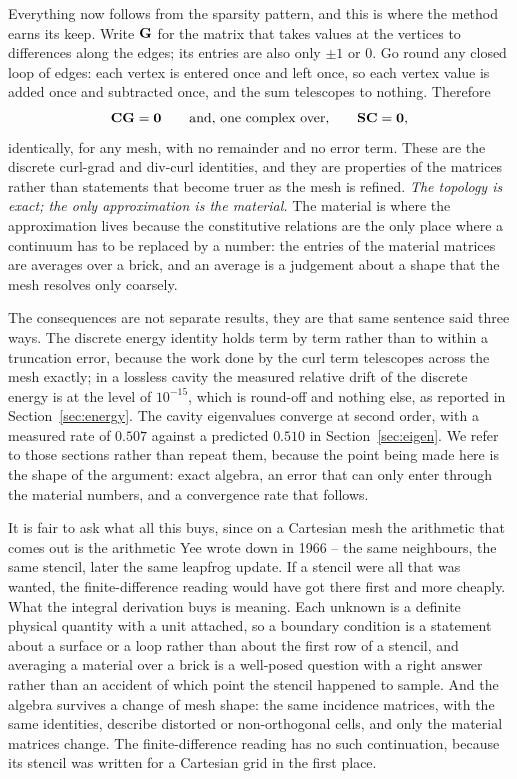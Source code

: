 Everything now follows from the sparsity pattern, and this is where the method earns its keep. Write $\mathbf{G}$ for
the matrix that takes values at the vertices to differences along the edges; its entries are also only $\pm 1$
or $0$. Go round any closed loop of edges: each vertex is entered once and left once, so each vertex value is
added once and subtracted once, and the sum telescopes to nothing. Therefore
\begin{equation}
  \mathbf{C} \mathbf{G} = \mathbf{0} \qquad \text{and, one complex over,} \qquad \mathbf{S} \mathbf{C} = \mathbf{0} ,
  \label{eq:hiw-identities}
\end{equation}
identically, for any mesh, with no remainder and no error term. These are the discrete curl-grad and div-curl
identities, and they are properties of the matrices rather than statements that become truer as the mesh is
refined. \emph{The topology is exact; the only approximation is the material.} The material is where the
approximation lives because the constitutive relations are the only place where a continuum has to be replaced
by a number: the entries of the material matrices are averages over a brick, and an average is a judgement about
a shape that the mesh resolves only coarsely.

The consequences are not separate results, they are that same sentence said three ways. The discrete energy
identity holds term by term rather than to within a truncation error, because the work done by the curl term
telescopes across the mesh exactly; in a lossless cavity the measured relative drift of the discrete energy is
at the level of $10^{-15}$, which is round-off and nothing else, as reported in Section~\ref{sec:energy}. The
cavity eigenvalues converge at second order, with a measured rate of $0.507$ against a predicted $0.510$ in
Section~\ref{sec:eigen}. We refer to those sections rather than repeat them, because the point being made here
is the shape of the argument: exact algebra, an error that can only enter through the material numbers, and a
convergence rate that follows.

It is fair to ask what all this buys, since on a Cartesian mesh the arithmetic that comes out is the arithmetic
Yee wrote down in 1966 -- the same neighbours, the same stencil, later the same leapfrog update. If a stencil
were all that was wanted, the finite-difference reading would have got there first and more cheaply. What the
integral derivation buys is meaning. Each unknown is a definite physical quantity with a unit attached, so a
boundary condition is a statement about a surface or a loop rather than about the first row of a stencil, and
averaging a material over a brick is a well-posed question with a right answer rather than an accident of which
point the stencil happened to sample. And the algebra survives a change of mesh shape: the same incidence
matrices, with the same identities, describe distorted or non-orthogonal cells, and only the material matrices
change. The finite-difference reading has no such continuation, because its stencil was written for a Cartesian
grid in the first place.

